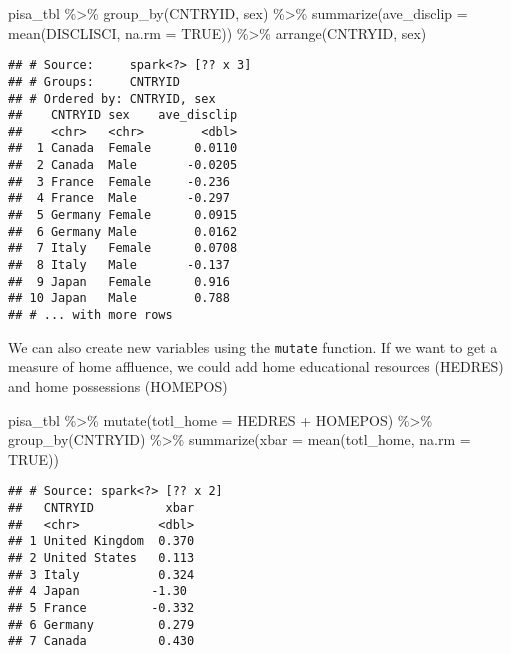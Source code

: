 \documentclass[
]{book}
\newenvironment{Shaded}{\begin{snugshade}}{\end{snugshade}}
\newcommand{\AttributeTok}[1]{\textcolor[rgb]{0.77,0.63,0.00}{#1}}
\newcommand{\ConstantTok}[1]{\textcolor[rgb]{0.00,0.00,0.00}{#1}}
\newcommand{\FunctionTok}[1]{\textcolor[rgb]{0.00,0.00,0.00}{#1}}
\newcommand{\NormalTok}[1]{#1}
\newcommand{\SpecialCharTok}[1]{\textcolor[rgb]{0.00,0.00,0.00}{#1}}
\begin{document}
\begin{Shaded}
\begin{Highlighting}[]
\NormalTok{pisa\_tbl }\SpecialCharTok{\%\textgreater{}\%} 
  \FunctionTok{group\_by}\NormalTok{(CNTRYID, sex) }\SpecialCharTok{\%\textgreater{}\%} 
  \FunctionTok{summarize}\NormalTok{(}\AttributeTok{ave\_disclip =} \FunctionTok{mean}\NormalTok{(DISCLISCI, }\AttributeTok{na.rm =} \ConstantTok{TRUE}\NormalTok{)) }\SpecialCharTok{\%\textgreater{}\%} 
  \FunctionTok{arrange}\NormalTok{(CNTRYID, sex)}
\end{Highlighting}
\end{Shaded}

\begin{verbatim}
## # Source:     spark<?> [?? x 3]
## # Groups:     CNTRYID
## # Ordered by: CNTRYID, sex
##    CNTRYID sex    ave_disclip
##    <chr>   <chr>        <dbl>
##  1 Canada  Female      0.0110
##  2 Canada  Male       -0.0205
##  3 France  Female     -0.236 
##  4 France  Male       -0.297 
##  5 Germany Female      0.0915
##  6 Germany Male        0.0162
##  7 Italy   Female      0.0708
##  8 Italy   Male       -0.137 
##  9 Japan   Female      0.916 
## 10 Japan   Male        0.788 
## # ... with more rows
\end{verbatim}

We can also create new variables using the \texttt{mutate} function. If we want to get a measure of home affluence, we could add home educational resources (HEDRES) and home possessions (HOMEPOS)

\begin{Shaded}
\begin{Highlighting}[]
\NormalTok{pisa\_tbl }\SpecialCharTok{\%\textgreater{}\%} 
  \FunctionTok{mutate}\NormalTok{(}\AttributeTok{totl\_home =}\NormalTok{ HEDRES }\SpecialCharTok{+}\NormalTok{ HOMEPOS) }\SpecialCharTok{\%\textgreater{}\%} 
  \FunctionTok{group\_by}\NormalTok{(CNTRYID) }\SpecialCharTok{\%\textgreater{}\%} 
  \FunctionTok{summarize}\NormalTok{(}\AttributeTok{xbar =} \FunctionTok{mean}\NormalTok{(totl\_home, }\AttributeTok{na.rm =} \ConstantTok{TRUE}\NormalTok{))}
\end{Highlighting}
\end{Shaded}

\begin{verbatim}
## # Source: spark<?> [?? x 2]
##   CNTRYID          xbar
##   <chr>           <dbl>
## 1 United Kingdom  0.370
## 2 United States   0.113
## 3 Italy           0.324
## 4 Japan          -1.30 
## 5 France         -0.332
## 6 Germany         0.279
## 7 Canada          0.430
\end{verbatim}
\end{document}
